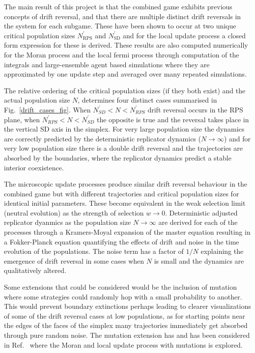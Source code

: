 \documentclass[%
 reprint,
 amsmath,amssymb,
 aps,
]{revtex4-2}
\begin{document}
The main result of this project is that the combined game exhibits previous concepts of drift reversal, 
and that there are multiple distinct drift reversals in the system for each subgame. These have been shown 
to occur at two unique critical population sizes $N^\prime_{\mathrm{RPS}}$ and 
$N^\prime_{\mathrm{SD}}$ and for the local update process a closed form expression for these is derived.
These results are also computed numerically for the Moran process and the local fermi process through 
computation of the integrals and large-ensemble agent based simulations where they are approximated by one update step 
and averaged over many repeated simulations.

The relative ordering of the critical population sizes (if they both exist) and 
the actual population size $N$, determines four distinct
cases summarised in Fig.~\ref{drift_cases_fig}. When $N^\prime_{SD} < N < N^\prime_{RPS}$ drift reversal occurs 
in the RPS plane, when $N^\prime_{RPS} < N < N^\prime_{SD}$ the opposite is true and the reversal takes place in the 
vertical SD axis in the simplex. For very large population size the dynamics are correctly predicted by the 
deterministic replicator dynamics ($N \rightarrow \infty$) and for very low population size
there is a double drift reversal and the trajectories are absorbed by the boundaries, where the replicator 
dynamics predict a stable interior coexistence.

The microscopic update processes produce similar drift reversal behaviour in the combined game but with 
different trajectories and critical population sizes for identical initial parameters.
These become equivalent in the weak selection limit (neutral evolution) 
as the strength of selection $w \rightarrow 0$. Deterministic adjusted replicator dyanmics as 
the population size $N \rightarrow \infty$ are derived for each of the processes through a 
Kramers-Moyal expansion of the master equation resulting in a Fokker-Planck equation quantifying the effects
of drift and noise in the time evolution of the populations. The noise term has a factor of $1/N$ 
explaining the emergence of drift reversal in some cases when $N$ is small and the dynamics are 
qualitatively altered.

Some extensions that could be considered would be the inclusion of mutation where some strategies could randomly hop with 
a small probability to another. This would prevent boundary extinctions perhaps 
leading to clearer visualizations of some of the drift reversal cases at low populations, 
as for starting points near the edges of the faces of the simplex many trajectories immediately 
get absorbed through pure random noise. The mutation extension has and has been considered in
Ref.~\cite{general_moran_process} where the Moran and local update process with mutations is explored.
\end{document}

